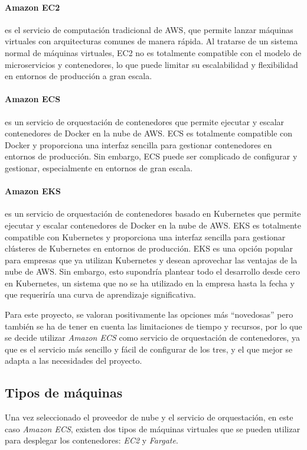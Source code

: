 \paragraph{Amazon EC2} es el servicio de computación tradicional de AWS, que
permite lanzar máquinas virtuales con arquitecturas comunes de manera rápida.
Al tratarse de un sistema normal de máquinas virtuales, EC2 no es totalmente
compatible con el modelo de microservicios y contenedores, lo que puede limitar
su escalabilidad y flexibilidad en entornos de producción a gran escala.

\paragraph{Amazon ECS} es un servicio de orquestación de contenedores que
permite ejecutar y escalar contenedores de Docker en la nube de AWS. ECS es
totalmente compatible con Docker y proporciona una interfaz sencilla para
gestionar contenedores en entornos de producción. Sin embargo, ECS puede ser
complicado de configurar y gestionar, especialmente en entornos de gran escala.

\paragraph{Amazon EKS} es un servicio de orquestación de contenedores basado
en Kubernetes que permite ejecutar y escalar contenedores de Docker en la nube
de AWS. EKS es totalmente compatible con Kubernetes y proporciona una interfaz
sencilla para gestionar clústeres de Kubernetes en entornos de producción. EKS
es una opción popular para empresas que ya utilizan Kubernetes y desean
aprovechar las ventajas de la nube de AWS. Sin embargo, esto supondría plantear
todo el desarrollo desde cero en Kubernetes, un sistema que no se ha utilizado
en la empresa hasta la fecha y que requeriría una curva de aprendizaje
significativa.

Para este proyecto, se valoran positivamente las opciones más ``novedosas'' pero
también se ha de tener en cuenta las limitaciones de tiempo y recursos, por lo
que se decide utilizar \textit{Amazon ECS} como servicio de orquestación de
contenedores, ya que es el servicio más sencillo y fácil de configurar de los
tres, y el que mejor se adapta a las necesidades del proyecto.


\newpage{}
\subsection{Tipos de máquinas}\label{subsec:alt_maquinas}
Una vez seleccionado el proveedor de nube y el servicio de orquestación, en
este caso \textit{Amazon ECS}, existen dos tipos de máquinas virtuales que se
pueden utilizar para desplegar los contenedores: \textit{EC2} y \textit{Fargate}.

